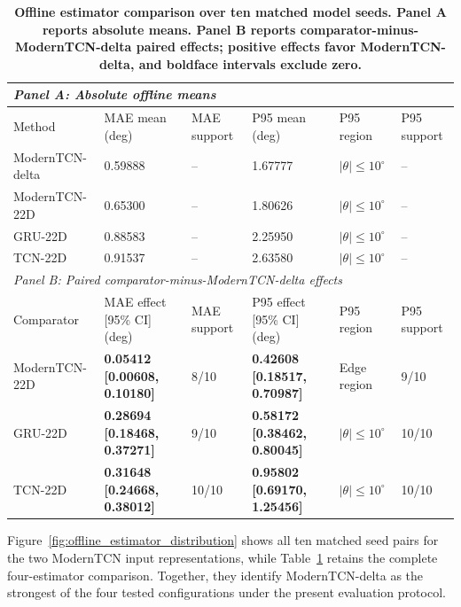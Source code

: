 \documentclass{ieeeaccess}
\begin{document}
\begin{table}[!t]
\centering
\caption{\textbf{Offline estimator comparison over ten matched model seeds. Panel A reports absolute means. Panel B reports comparator-minus-ModernTCN-delta paired effects; positive effects favor ModernTCN-delta, and boldface intervals exclude zero.}}
\label{tab:estimator_and_delta_results}
\scriptsize
\setlength{\tabcolsep}{2.6pt}
\begin{tabular}{|p{}|p{}|p{}|p{}|p{}|p{}|}
\hline
\multicolumn{6}{|l|}{\textit{Panel A: Absolute offline means}} \\
\hline
Method & MAE mean (deg) & MAE support & P95 mean (deg) & P95 region & P95 support \\
\hline
ModernTCN-delta & 0.59888 & -- & 1.67777 & $|\theta|\leq10^{\circ}$ & -- \\
ModernTCN-22D & 0.65300 & -- & 1.80626 & $|\theta|\leq10^{\circ}$ & -- \\
GRU-22D & 0.88583 & -- & 2.25950 & $|\theta|\leq10^{\circ}$ & -- \\
TCN-22D & 0.91537 & -- & 2.63580 & $|\theta|\leq10^{\circ}$ & -- \\
\hline
\multicolumn{6}{|l|}{\textit{Panel B: Paired comparator-minus-ModernTCN-delta effects}} \\
\hline
Comparator & MAE effect [95\% CI] (deg) & MAE support & P95 effect [95\% CI] (deg) & P95 region & P95 support \\
\hline
ModernTCN-22D & \textbf{0.05412 [0.00608, 0.10180]} & 8/10 & \textbf{0.42608 [0.18517, 0.70987]} & Edge region & 9/10 \\
GRU-22D & \textbf{0.28694 [0.18468, 0.37271]} & 9/10 & \textbf{0.58172 [0.38462, 0.80045]} & $|\theta|\leq10^{\circ}$ & 10/10 \\
TCN-22D & \textbf{0.31648 [0.24668, 0.38012]} & 10/10 & \textbf{0.95802 [0.69170, 1.25456]} & $|\theta|\leq10^{\circ}$ & 10/10 \\
\hline
\end{tabular}
\end{table}

Figure~\ref{fig:offline_estimator_distribution} shows all ten matched seed pairs for the two ModernTCN input representations, while Table~\ref{tab:estimator_and_delta_results} retains the complete four-estimator comparison. Together, they identify ModernTCN-delta as the strongest of the four tested configurations under the present evaluation protocol.
\end{document}
